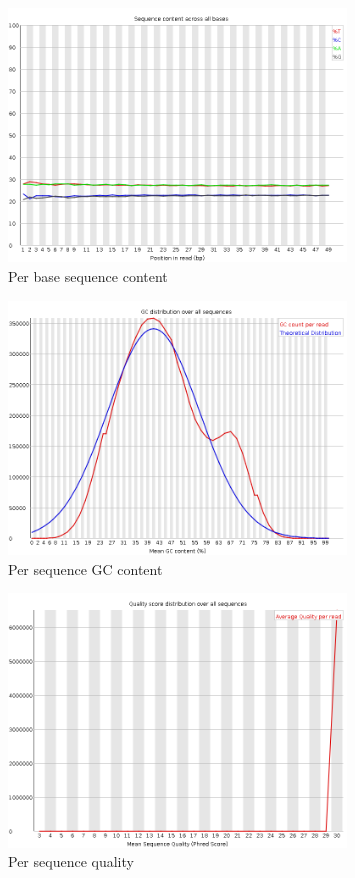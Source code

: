\documentclass[UTF8]{ctexart}
\begin{document}
\begin{figure}[!htb]
	\centering
	\includegraphics[width=0.8\textwidth]{img/SRR14325859_FastQC_Origin_img/per_base_sequence_content.png}	%
	\caption{Per base sequence content\protect}    %
\end{figure}

\begin{figure}[!htb]
	\centering
	\includegraphics[width=0.8\textwidth]{img/SRR14325859_FastQC_Origin_img/per_sequence_gc_content.png}	%
	\caption{Per sequence GC content\protect}    %
\end{figure}

\begin{figure}[!htb]
	\centering
	\includegraphics[width=0.8\textwidth]{img/SRR14325859_FastQC_Origin_img/per_sequence_quality.png}	%
	\caption{Per sequence quality\protect}    %
\end{figure}
\end{document}
